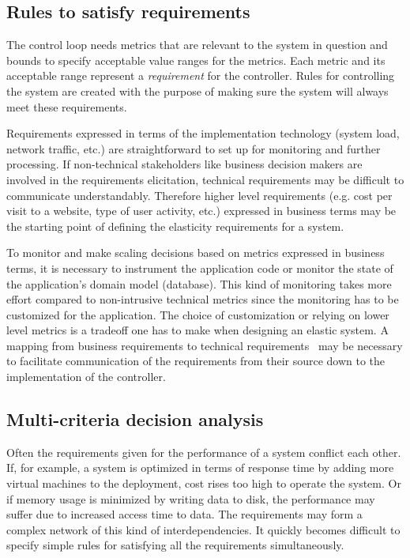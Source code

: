 \documentclass[english]{tktltiki2}
\theoremstyle{definition}
\theoremstyle{remark}
\begin{document}
\subsection{Rules to satisfy requirements} The control loop needs metrics that
are relevant to the system in question and bounds to specify acceptable value
ranges for the metrics. Each metric and its acceptable range represent a
\emph{requirement} for the controller. Rules for controlling the system are
created with the purpose of making sure the system will always meet these
requirements.

Requirements expressed in terms of the implementation technology (system load,
network traffic, etc.) are straightforward to set up for monitoring and further
processing. If non-technical stakeholders like business decision makers are
involved in the requirements elicitation, technical requirements may be
difficult to communicate understandably. Therefore higher level requirements
(e.g. cost per visit to a website, type of user activity, etc.) expressed in
business terms may be the starting point of defining the elasticity requirements
for a system.

To monitor and make scaling decisions based on metrics expressed in business
terms, it is necessary to instrument the application code or monitor the state
of the application's domain model (database). This kind of monitoring takes more
effort compared to non-intrusive technical metrics since the monitoring has to
be customized for the application. The choice of customization or relying on
lower level metrics is a tradeoff one has to make when designing an elastic
system. A mapping from business requirements to technical requirements~
\cite{Chen2008}\cite{Emeakaroha2010}\cite{Wu2011}\cite{Suleiman2011} may be
necessary to facilitate communication of the requirements from their source down
to the implementation of the controller.

\subsection{Multi-criteria decision analysis} Often the requirements given for
the performance of a system conflict each other. If, for example, a system is
optimized in terms of response time by adding more virtual machines to the
deployment, cost rises too high to operate the system. Or if memory usage is
minimized by writing data to disk, the performance may suffer due to increased
access time to data. The requirements may form a complex network of this kind of
interdependencies. It quickly becomes difficult to specify simple rules for
satisfying all the requirements simultaneously.
\end{document}
